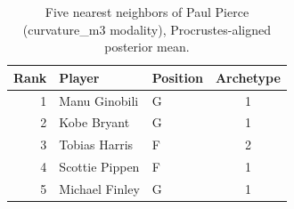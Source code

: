 \begin{table}[htbp]
  \centering\small
  \begin{tabular}{rllc}
    \toprule
    Rank & Player & Position & Archetype \\
    \midrule
    1 & Manu Ginobili & G & 1 \\
    2 & Kobe Bryant & G & 1 \\
    3 & Tobias Harris & F & 2 \\
    4 & Scottie Pippen & F & 1 \\
    5 & Michael Finley & G & 1 \\
    \bottomrule
  \end{tabular}
  \caption{Five nearest neighbors of Paul Pierce (curvature_m3 modality), Procrustes-aligned posterior mean.}
  \label{tab:Paul_Pierce_neighbors_curvature_m3}
\end{table}

